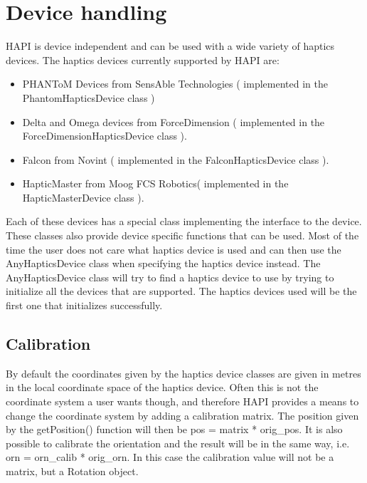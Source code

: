 
\chapter {Device handling}
HAPI is device independent and can be used with a wide variety of haptics devices. The haptics devices currently supported by HAPI are:

\begin{itemize}
\item PHANToM Devices from SensAble Technologies ( implemented in the
  PhantomHapticsDevice class ) \cite{sensable}
\item Delta and Omega devices from ForceDimension ( implemented in the
  ForceDimensionHapticsDevice class ). \cite{forcedimension} 
\item Falcon from Novint ( implemented in the FalconHapticsDevice class ). \cite{novint} 
\item HapticMaster from Moog FCS Robotics( implemented in the HapticMasterDevice class ).\cite{moogfcs} \cite{linde02hapticmaster} 
\end{itemize}

Each of these devices has a special class implementing the interface to the device. These classes also provide device specific functions that can be used. Most of the time the user does not care what haptics device is used and can then use the AnyHapticsDevice class when specifying the haptics device instead. The AnyHapticsDevice class will try to find a haptics device to use by trying to initialize all the devices that are supported. The haptics devices used will be the first one that initializes successfully.

\section{Calibration}
By default the coordinates given by the haptics device classes are
given in metres in the local coordinate space of the haptics
device. Often this is not the coordinate system a user wants
though, and therefore HAPI provides a means to change the coordinate
system by adding a calibration matrix. The position given by the
getPosition() function will then be pos = matrix * orig\_pos. It is
also possible to calibrate the orientation and the result will be in
the same way, i.e. orn = orn\_calib * orig\_orn. In this case the
calibration value will not be a matrix, but a Rotation object.

